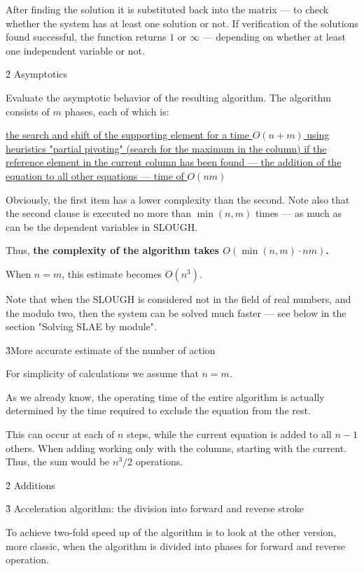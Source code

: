 After finding the solution it is substituted back into the matrix --- to check whether the system has at least one solution or not. If verification of the solutions found successful, the function returns $1$ or $\infty$ --- depending on whether at least one independent variable or not.



\h2{ Asymptotics }

Evaluate the asymptotic behavior of the resulting algorithm. The algorithm consists of $m$ phases, each of which is:

\ul{
\li the search and shift of the supporting element for a time $O(n+m)$ using heuristics "partial pivoting" (search for the maximum in the column)
\li if the reference element in the current column has been found --- the addition of the equation to all other equations --- time of $O(nm)$
}

Obviously, the first item has a lower complexity than the second. Note also that the second clause is executed no more than $\min(n,m)$ times --- as much as can be the dependent variables in SLOUGH.

Thus, \bf{the complexity} of the algorithm takes $O (\min(n,m) \cdot n m)$.

When $n = m$, this estimate becomes $O(n^3)$.

Note that when the SLOUGH is considered not in the field of real numbers, and the modulo two, then the system can be solved much faster --- see below in the section "Solving SLAE by module".

\h3{More accurate estimate of the number of action}

For simplicity of calculations we assume that $n = m$.

As we already know, the operating time of the entire algorithm is actually determined by the time required to exclude the equation from the rest.

This can occur at each of $n$ steps, while the current equation is added to all $n-1$ others. When adding working only with the columns, starting with the current. Thus, the sum would be $n^3 / 2$ operations.




\h2{ Additions }


\h3{ Acceleration algorithm: the division into forward and reverse stroke }

To achieve two-fold speed up of the algorithm is to look at the other version, more classic, when the algorithm is divided into phases for forward and reverse operation.

